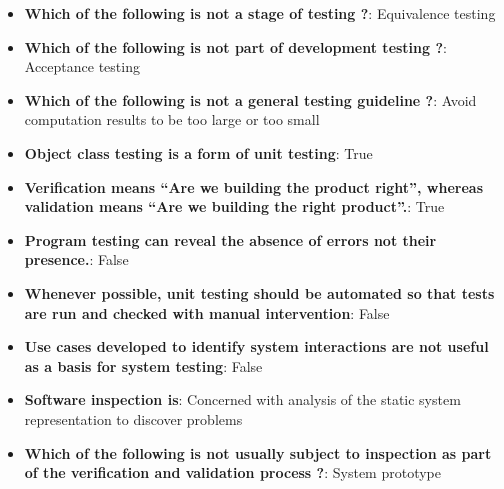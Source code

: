 \documentclass{report}
\begin{document}
    \pagebreak 
    \begin{itemize}
        \item \textbf{Which of the following is not a stage of testing ?}: Equivalence testing
        \item \textbf{Which of the following is not part of development testing ?}: Acceptance testing
        \item \textbf{Which of the following is not a general testing guideline ?}: Avoid computation results to be too large or too small
        \item \textbf{Object class testing is a form of unit testing}: True
        \item \textbf{Verification means “Are we building the product right”, whereas validation means “Are we building the right product”.}: True
        \item \textbf{Program testing can reveal the absence of errors not their presence.}: False
        \item \textbf{Whenever possible, unit testing should be automated so that tests are run and checked with manual intervention}: False
        \item \textbf{Use cases developed to identify system interactions are not useful as a basis for system testing}: False
        \item \textbf{Software inspection is}: Concerned with analysis of the static system representation to discover problems
        \item \textbf{Which of the following is not usually subject to inspection as part of the verification and validation process ?}: System prototype
    \end{itemize}

    \pagebreak 
\end{document}
